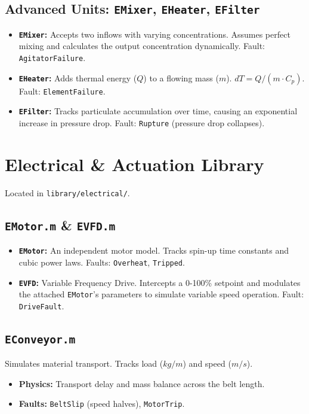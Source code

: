 \documentclass[11pt,a4paper]{report}
\begin{document}
\section{Advanced Units: \texttt{EMixer}, \texttt{EHeater}, \texttt{EFilter}}
\begin{itemize}
    \item \textbf{\texttt{EMixer}:} Accepts two inflows with varying concentrations. Assumes perfect mixing and calculates the output concentration dynamically. Fault: \texttt{AgitatorFailure}.
    \item \textbf{\texttt{EHeater}:} Adds thermal energy ($Q$) to a flowing mass ($m$). $dT = Q / (m \cdot C_p)$. Fault: \texttt{ElementFailure}.
    \item \textbf{\texttt{EFilter}:} Tracks particulate accumulation over time, causing an exponential increase in pressure drop. Fault: \texttt{Rupture} (pressure drop collapses).
\end{itemize}

\chapter{Electrical \& Actuation Library}
Located in \texttt{library/electrical/}.

\section{\texttt{EMotor.m} \& \texttt{EVFD.m}}
\begin{itemize}
    \item \textbf{\texttt{EMotor}:} An independent motor model. Tracks spin-up time constants and cubic power laws. Faults: \texttt{Overheat}, \texttt{Tripped}.
    \item \textbf{\texttt{EVFD}:} Variable Frequency Drive. Intercepts a 0-100\% setpoint and modulates the attached \texttt{EMotor}'s parameters to simulate variable speed operation. Fault: \texttt{DriveFault}.
\end{itemize}

\section{\texttt{EConveyor.m}}
Simulates material transport. Tracks load ($kg/m$) and speed ($m/s$).
\begin{itemize}
    \item \textbf{Physics:} Transport delay and mass balance across the belt length.
    \item \textbf{Faults:} \texttt{BeltSlip} (speed halves), \texttt{MotorTrip}.
\end{itemize}
\end{document}
